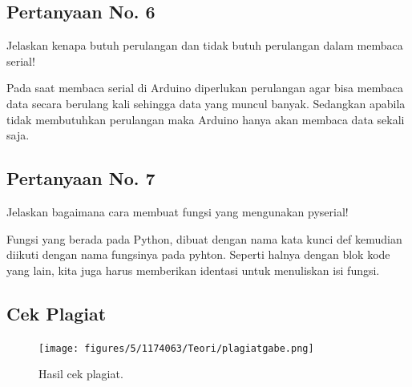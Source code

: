 \subsection{Pertanyaan No. 6}
Jelaskan kenapa butuh perulangan dan tidak butuh perulangan dalam membaca serial!

\hfill \break
Pada saat membaca serial di Arduino diperlukan perulangan agar bisa membaca data secara berulang kali sehingga data yang muncul banyak. Sedangkan apabila tidak membutuhkan perulangan maka Arduino hanya akan membaca data sekali saja.

\subsection{Pertanyaan No. 7}
Jelaskan bagaimana cara membuat fungsi yang mengunakan pyserial!

\hfill \break
Fungsi yang berada pada Python, dibuat dengan nama kata kunci def kemudian diikuti dengan nama fungsinya pada pyhton.
Seperti halnya dengan blok kode yang lain, kita juga harus memberikan identasi untuk menuliskan isi fungsi.

\subsection{Cek Plagiat}
\begin{figure}[H]
	\texttt{[image: figures/5/1174063/Teori/plagiatgabe.png]}
	\centering
	\caption{Hasil cek plagiat.}
\end{figure}